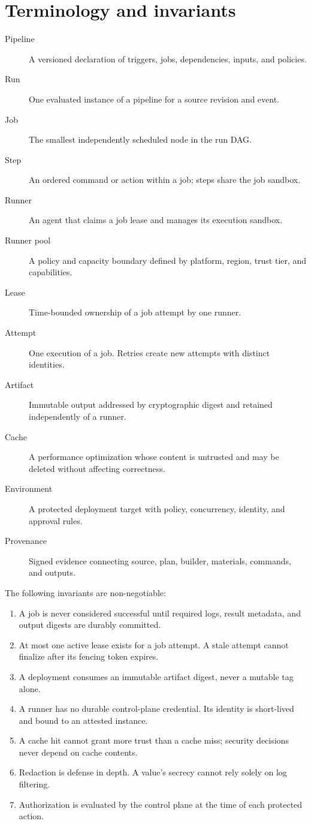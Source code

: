 \section{Terminology and invariants}

\begin{description}
  \item[Pipeline] A versioned declaration of triggers, jobs, dependencies, inputs, and policies.
  \item[Run] One evaluated instance of a pipeline for a source revision and event.
  \item[Job] The smallest independently scheduled node in the run DAG.
  \item[Step] An ordered command or action within a job; steps share the job sandbox.
  \item[Runner] An agent that claims a job lease and manages its execution sandbox.
  \item[Runner pool] A policy and capacity boundary defined by platform, region, trust tier, and capabilities.
  \item[Lease] Time-bounded ownership of a job attempt by one runner.
  \item[Attempt] One execution of a job. Retries create new attempts with distinct identities.
  \item[Artifact] Immutable output addressed by cryptographic digest and retained independently of a runner.
  \item[Cache] A performance optimization whose content is untrusted and may be deleted without affecting correctness.
  \item[Environment] A protected deployment target with policy, concurrency, identity, and approval rules.
  \item[Provenance] Signed evidence connecting source, plan, builder, materials, commands, and outputs.
\end{description}

The following invariants are non-negotiable:

\begin{enumerate}
  \item A job is never considered successful until required logs, result metadata, and output digests are durably committed.
  \item At most one active lease exists for a job attempt. A stale attempt cannot finalize after its fencing token expires.
  \item A deployment consumes an immutable artifact digest, never a mutable tag alone.
  \item A runner has no durable control-plane credential. Its identity is short-lived and bound to an attested instance.
  \item A cache hit cannot grant more trust than a cache miss; security decisions never depend on cache contents.
  \item Redaction is defense in depth. A value's secrecy cannot rely solely on log filtering.
  \item Authorization is evaluated by the control plane at the time of each protected action.
\end{enumerate}

